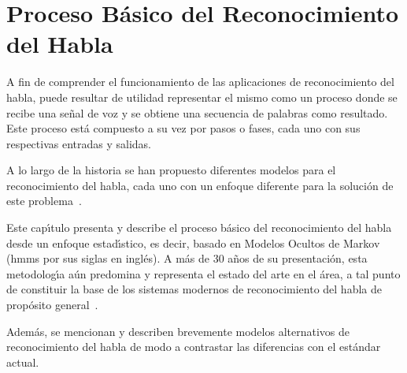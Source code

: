 \chapter{Proceso B\'{a}sico del Reconocimiento del Habla}
\label{sec:proceso}

A fin de comprender el funcionamiento de las aplicaciones de reconocimiento del habla, puede resultar de utilidad
representar el mismo como un proceso donde se recibe una se\~nal de voz y se obtiene una secuencia de palabras como
resultado. Este proceso est\'a compuesto a su vez por pasos o fases, cada uno con sus respectivas entradas y salidas.

A lo largo de la historia se han propuesto diferentes modelos para el reconocimiento del habla, cada uno
con un enfoque diferente para la soluci\'on de este \mbox{problema \cite{VimalaReview2012}}. 

Este cap{\'\i}tulo presenta y describe el proceso b\'asico del reconocimiento del habla desde un 
enfoque estad{\'\i}stico, es decir, basado en Modelos Ocultos de Markov (\gls{hmm}s por sus siglas en ingl\'es). 
A m\'as de 30 a\~nos de su presentaci\'on, esta metodolog{\'\i}a a\'un predomina y representa el estado 
del arte en el \'area, a tal punto de constituir la base de los sistemas modernos de reconocimiento del habla 
de prop\'osito \mbox{general \cite{BakerResearch2009, VimalaReview2012}}.

Adem\'as, se mencionan y describen brevemente modelos alternativos de reconocimiento del habla de modo a contrastar
las diferencias con el est\'andar actual.



